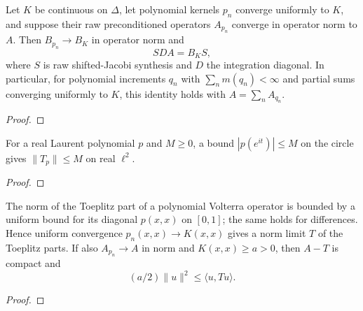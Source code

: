 \begin{supporting}
\begin{theorem}
\label{thm:continuous-volterra-raw-bridge}
\leanok
Let $K$ be continuous on $\Delta$, let polynomial kernels $p_n$ converge
uniformly to $K$, and suppose their raw preconditioned operators $A_{p_n}$
converge in operator norm to $A$. Then $B_{p_n}\to B_K$ in operator norm and
\[
 S D A=B_K S,
\]
where $S$ is raw shifted-Jacobi synthesis and $D$ the integration diagonal.
In particular, for polynomial increments $q_n$ with $\sum_n m(q_n)<\infty$
and partial sums converging uniformly to $K$, this identity holds with
$A=\sum_n A_{q_n}$.

\end{theorem}
\begin{proof}
\leanok
\end{proof}


\begin{theorem}
\label{thm:real-toeplitz-norm}
\leanok
For a real Laurent polynomial $p$ and $M\ge0$, a bound $|p(e^{it})|\le M$
on the circle gives $\|T_p\|\le M$ on real $\ell^2$.
\end{theorem}
\begin{proof}
\leanok
\end{proof}

\begin{theorem}
\label{thm:volterra-toeplitz-limit}
\leanok
The norm of the Toeplitz part of a polynomial Volterra operator is bounded
by a uniform bound for its diagonal $p(x,x)$ on $[0,1]$; the same holds for
differences. Hence uniform convergence $p_n(x,x)\to K(x,x)$ gives a norm limit
$T$ of the Toeplitz parts. If also $A_{p_n}\to A$ in norm and
$K(x,x)\ge a>0$, then $A-T$ is compact and
\[
 (a/2)\|u\|^2\le\langle u,Tu\rangle.
\]
\end{theorem}
\begin{proof}
\leanok
\end{proof}


\end{supporting}
